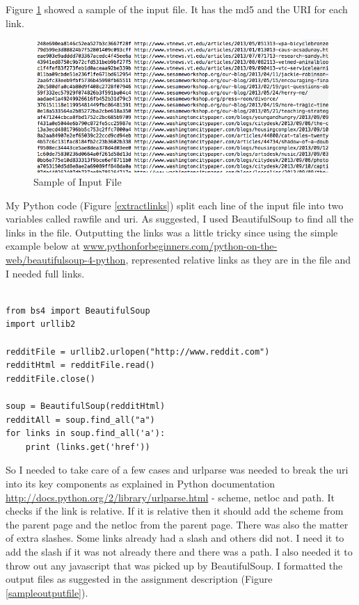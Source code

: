 \documentclass{article}
\begin{document}
Figure \ref{inputfile} showed a sample of the input file. It has the md5 and the URI for each link.

\begin{figure}[H]
\centering
\includegraphics[scale=0.50]{q1/inputfile}
\caption{Sample of Input File}
\label{inputfile}
\end{figure}

My Python code (Figure \ref{extractlinks}) split each line of the input file into two variables called rawfile and uri. As suggested, I used BeautifulSoup to find all the links in the file. Outputting the links was a little tricky since using the simple example below at \url{www.pythonforbeginners.com/python-on-the-web/beautifulsoup-4-python}, represented relative links as they are in the file and I needed full links.

\begin{verbatim}

from bs4 import BeautifulSoup
import urllib2
 
redditFile = urllib2.urlopen("http://www.reddit.com")
redditHtml = redditFile.read()
redditFile.close()
 
soup = BeautifulSoup(redditHtml)
redditAll = soup.find_all("a")
for links in soup.find_all('a'):
    print (links.get('href'))

\end{verbatim}

So I needed to take care of a few cases and urlparse was needed to break the uri into its key components as explained in Python documentation \url{http://docs.python.org/2/library/urlparse.html} - scheme, netloc and path. It checks if the link is relative. If it is relative then it should add the scheme from the parent page and the netloc from the parent page. There was also the matter of extra slashes. Some links already had a slash and others did not. I need it to add the slash if it was not already there and there was a path. I also needed it to throw out any javascript that was picked up by BeautifulSoup. I formatted the output files as suggested in the assignment description (Figure \ref{sampleoutputfile}).
\end{document}
